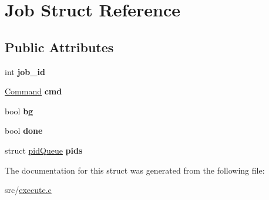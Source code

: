 \hypertarget{structJob}{}\section{Job Struct Reference}
\label{structJob}
\subsection*{Public Attributes}
\begin{DoxyCompactItemize}
\item 
int {\bfseries job\+\_\+id}\hypertarget{structJob_ab154568a2319db1e0cf6296872e6a398}{}\label{structJob_ab154568a2319db1e0cf6296872e6a398}

\item 
\hyperlink{unionCommand}{Command} {\bfseries cmd}\hypertarget{structJob_ab2c31cbc7fdc94323f0c12fe0e07beda}{}\label{structJob_ab2c31cbc7fdc94323f0c12fe0e07beda}

\item 
bool {\bfseries bg}\hypertarget{structJob_ae2473991ef97b97f0bd354f33aedb2a0}{}\label{structJob_ae2473991ef97b97f0bd354f33aedb2a0}

\item 
bool {\bfseries done}\hypertarget{structJob_afdb886791770fb31025cce60d25e20c2}{}\label{structJob_afdb886791770fb31025cce60d25e20c2}

\item 
struct \hyperlink{structpidQueue}{pid\+Queue} {\bfseries pids}\hypertarget{structJob_acdd53e112b611d0ce35c7a1148ca1c1a}{}\label{structJob_acdd53e112b611d0ce35c7a1148ca1c1a}

\end{DoxyCompactItemize}


The documentation for this struct was generated from the following file\+:\begin{DoxyCompactItemize}
\item 
src/\hyperlink{execute_8c}{execute.\+c}\end{DoxyCompactItemize}
